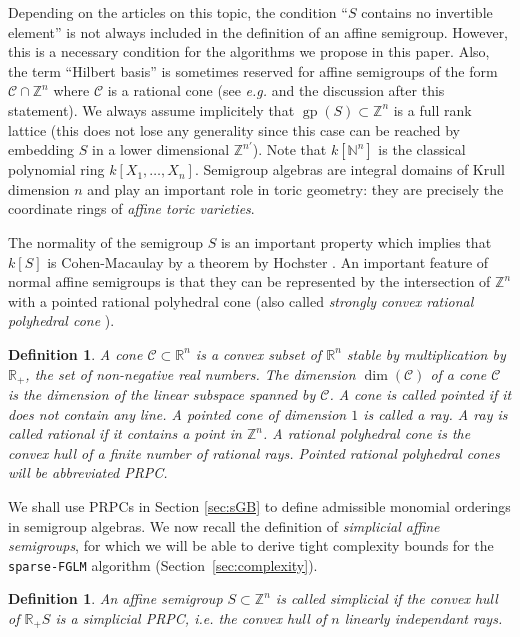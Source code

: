 \documentclass[12pt]{article}
\numberwithin{equation}{section}
\numberwithin{theorem}{section}
\newtheorem{definition}[theorem]{Definition}
\newcommand{\Z}{\mathbb{Z}}
\DeclareMathOperator{\gp}{gp}
\newcommand{\sgp}{S}
\newcommand{\cone}{\mathscr C}
\newcommand{\R}{\mathbb{R}}
\newcommand{\N}{\mathbb{N}}
\begin{document}
Depending on the articles on this topic, the condition ``$\sgp$
contains no invertible element'' is not always included in the
definition of an affine semigroup. However, this is a necessary
condition for the algorithms we propose in this paper. Also, the term
``Hilbert basis'' is sometimes reserved for affine semigroups of the
form $\cone\cap\Z^n$ where $\cone$ is a rational cone (see \emph{e.g.}
\cite[Prop.~7.15]{MilStu05} and the discussion after this
statement). We always assume implicitely that $\gp(S)\subset\Z^n$ is a
full rank lattice (this does not lose any generality since this case
can be reached by embedding $S$ in a lower dimensional
$\Z^{n'}$). Note that $k[\N^n]$ is the classical polynomial ring
$k[X_1,\ldots, X_n]$. Semigroup algebras are integral domains
\cite[Thm. 7.4]{MilStu05} of Krull dimension $n$ and play an important
role in toric geometry: they are precisely the coordinate rings of
\emph{affine toric varieties}.  

The normality of the semigroup $\sgp$
is an important property which implies that $k[\sgp]$ is
Cohen-Macaulay by a theorem by Hochster \cite{Hoc72}.
An important feature of normal affine semigroups is that they can be represented by the intersection of $\Z^n$ with a pointed rational polyhedral cone (also called \emph{stron\-gly convex rational polyhedral cone} \cite[Sec 1.1]{Oda88}).
\begin{definition}
A \emph{cone} $\cone\subset \R^n$ is a convex subset of $\R^n$ stable by multiplication by $\R_+$, the set of non-negative real numbers. The dimension $\dim(\cone)$ of a cone $\cone$ is the dimension of the linear subspace spanned by $\cone$. A cone is called \emph{pointed} if it does not contain any line. A pointed cone of dimension $1$ is called a ray. A ray is called \emph{rational} if it contains a point in $\Z^n$. A \emph{rational polyhedral cone} is the convex hull of a finite number of rational rays. Pointed rational polyhedral cones will be abbreviated \emph{PRPC}. 
\end{definition}

We shall use PRPCs in Section \ref{sec:sGB} to define admissible
monomial orderings in semigroup algebras.
We now recall the definition of \emph{simplicial affine semigroups}, for which we will be able to derive tight complexity bounds for the {\tt sparse-FGLM} algorithm (Section~\ref{sec:complexity}).

\begin{definition}\label{def:simplicial}
  An affine semigroup $S\subset \Z^n$ is called simplicial if the convex hull of $\R_{+}S$ is a simplicial PRPC, \emph{i.e.} the convex hull of $n$ linearly independant rays. 
\end{definition}
\end{document}
